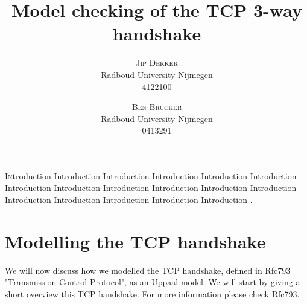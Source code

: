 \documentclass[twocolumn]{article}
\title{\vspace{-15mm}%
	\fontsize{24pt}{10pt}\selectfont
	\textbf{Model checking of the TCP 3-way handshake}
	}
\author{%
	\large
	\textsc{Jip Dekker} \\[2mm]
	\normalsize	Radboud University Nijmegen \\
	\normalsize	4122100
	\vspace{-5mm}
	\and 
	\large
	\textsc{Ben Br\"ucker} \\[2mm]
	\normalsize	Radboud University Nijmegen \\
	\normalsize	0413291
	\vspace{-5mm}
	}
\date{}
\begin{document}

\thispagestyle{fancy}

\lettrine[nindent=0em,lines=3]{I} ntroduction Introduction Introduction Introduction Introduction Introduction Introduction Introduction Introduction Introduction Introduction Introduction Introduction Introduction Introduction Introduction Introduction .

\section{Modelling the TCP handshake}
We will now discuss how we modelled the TCP handshake, defined in Rfc793 "Transmission Control Protocol", as an Uppaal model. We will start by giving a short overview this TCP handshake. For more information please check Rfc793.
\end{document}
